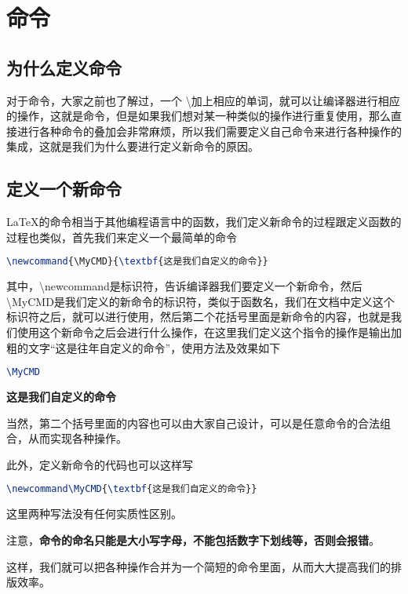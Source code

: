 \newcommand{\MyCMD}{\textbf{这是我们自定义的命令}}
\newcommand{\MyCMDone}[1]{\textbf{#1}}
\newcommand{\MyCMDtwo}[3]{(#1+#2)^#3}
\newcommand{\MyCMDthree}[3][x]{(#1+#2)^#3}

\chapter{命令}
\section{为什么定义命令}
对于命令，大家之前也了解过，一个  \textbackslash 加上相应的单词，就可以让编译器进行相应的操作，这就是命令，但是如果我们想对某一种类似的操作进行重复使用，那么直接进行各种命令的叠加会非常麻烦，所以我们需要定义自己命令来进行各种操作的集成，这就是我们为什么要进行定义新命令的原因。
\section{定义一个新命令}
\LaTeX{}的命令相当于其他编程语言中的函数，我们定义新命令的过程跟定义函数的过程也类似，首先我们来定义一个最简单的命令
\begin{lstlisting}[language=TeX]
\newcommand{\MyCMD}{\textbf{这是我们自定义的命令}}
\end{lstlisting}

其中，\textbackslash newcommand是标识符，告诉编译器我们要定义一个新命令，然后\textbackslash MyCMD是我们定义的新命令的标识符，类似于函数名，我们在文档中定义这个标识符之后，就可以进行使用，然后第二个花括号里面是新命令的内容，也就是我们使用这个新命令之后会进行什么操作，在这里我们定义这个指令的操作是输出加粗的文字“这是往年自定义的命令”，使用方法及效果如下
\begin{lstlisting}[language=TeX]
\MyCMD
\end{lstlisting}

\MyCMD

当然，第二个括号里面的内容也可以由大家自己设计，可以是任意命令的合法组合，从而实现各种操作。

此外，定义新命令的代码也可以这样写
\begin{lstlisting}[language=TeX]
\newcommand\MyCMD{\textbf{这是我们自定义的命令}}
\end{lstlisting}

这里两种写法没有任何实质性区别。

注意，\textbf{命令的命名只能是大小写字母，不能包括数字下划线等，否则会报错}。

这样，我们就可以把各种操作合并为一个简短的命令里面，从而大大提高我们的排版效率。
